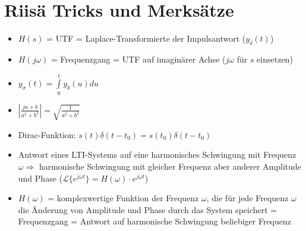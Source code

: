 \section{Riisä Tricks und Merksätze}
\begin{itemize}
  \item $H(s)$ = UTF = Laplace-Transformierte der Impulsantwort ($y_\delta(t)$)
  \item $H(j \omega)$ = Frequenzgang = UTF auf imaginärer Achse ($j \omega$ für $s$ einsetzen)
  \item $y_\sigma(t) = \int\limits_0^t y_\delta(u)du$
  \item $\left| \frac{ja + b}{a^2 + b^2} \right| = \sqrt{\frac{1}{a^2 + b^2}}$
  \item Dirac-Funktion: $s(t)\delta(t-t_0) = s(t_0)\delta(t-t_0)$
  \item Antwort eines LTI-Systems auf eine harmonisches Schwingung mit Frequenz $\omega \Rightarrow$ harmonische
  Schwingung mit gleicher Frequenz aber anderer Amplitude und Phase ($\mathcal{L}\{e^{j \omega t}\} = H(\omega) \cdot
  e^{j \omega t}$)
  \item $H(\omega)$ = komplexwertige Funktion der Frequenz $\omega$, die für jede Frequenz $\omega$ die
  Änderung von Amplitude und Phase durch das System speichert = Frequenzgang = Antwort auf harmonische Schwingung
  beliebiger Frequenz
\end{itemize}
